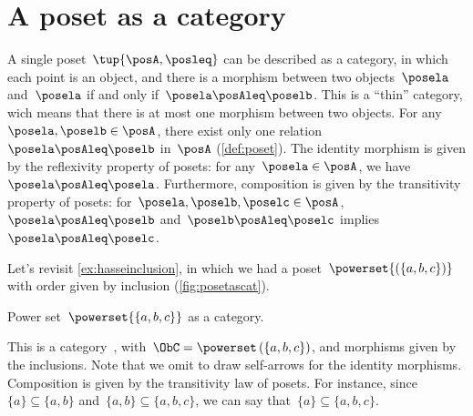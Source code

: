 

\section{A poset as a category}
\label{sec:posetsarecats}
A single poset~$\tup{\posA, \posleq}$ can be described as a category, in which each point is an object, and there is a morphism between two objects~$\posela$ and~$\posela$ if and only if~$\posela \posAleq \poselb$.
This is a ``thin'' category, wich means that there is at most one morphism between two objects.
For any~$\posela,\poselb\in \posA$, there exist only one relation~$\posela\posAleq \poselb$ in~$\posA$ (\cref{def:poset}).
The identity morphism is given by the reflexivity property of posets: for any~$\posela\in \posA$, we have~$\posela \posAleq \posela$.
Furthermore, composition is given by the transitivity property of posets: for~$\posela,\poselb,\poselc \in \posA$,~$\posela\posAleq \poselb$ and~$\poselb\posAleq \poselc$ implies~$\posela\posAleq \poselc$.

\begin{example}
  Let's revisit \cref{ex:hasseinclusion}, in which we had a poset~$\powerset{\left(\{a,b,c\}\right)}$ with order given by inclusion (\cref{fig:posetascat}).

  \begin{marginfigure}
    \begin{center}
    \end{center}
    \caption{Power set~$\powerset{\{a,b,c\}}$ as a category. \label{fig:posetascat}}
  \end{marginfigure}

  This is a category~\CatC, with~$\ObC=\powerset\left(\{a,b,c\}\right)$, and morphisms given by the inclusions. Note that we omit to draw self-arrows for the identity morphisms. Composition is given by the transitivity law of posets. For instance, since~$\{a\}\subseteq \{a,b\}$ and~$\{a,b\} \subseteq \{a,b,c\}$, we can say that~$\{a\}\subseteq \{a,b,c\}$.
\end{example}


